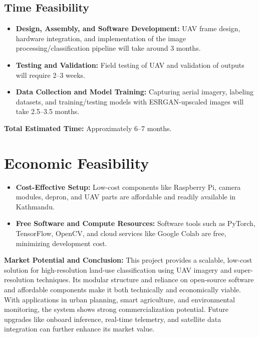 \subsection{Time Feasibility}
\begin{itemize}
  \item \textbf{Design, Assembly, and Software Development:} UAV frame design, hardware integration, and implementation of the image processing/classification pipeline will take around 3 months.
  \item \textbf{Testing and Validation:} Field testing of UAV and validation of outputs will require 2--3 weeks.
  \item \textbf{Data Collection and Model Training:} Capturing aerial imagery, labeling datasets, and training/testing models with ESRGAN-upscaled images will take 2.5--3.5 months.
\end{itemize}

\noindent\textbf{Total Estimated Time:} Approximately 6--7 months.

\section{Economic Feasibility}

\begin{itemize}
  \item \textbf{Cost-Effective Setup:} Low-cost components like Raspberry Pi, camera modules, depron, and UAV parts are affordable and readily available in Kathmandu.
  \item \textbf{Free Software and Compute Resources:} Software tools such as PyTorch, TensorFlow, OpenCV, and cloud services like Google Colab are free, minimizing development cost.
\end{itemize}

\noindent\textbf{Market Potential and Conclusion:}  
This project provides a scalable, low-cost solution for high-resolution land-use classification using UAV imagery and super-resolution techniques. Its modular structure and reliance on open-source software and affordable components make it both technically and economically viable. With applications in urban planning, smart agriculture, and environmental monitoring, the system shows strong commercialization potential. Future upgrades like onboard inference, real-time telemetry, and satellite data integration can further enhance its market value.
